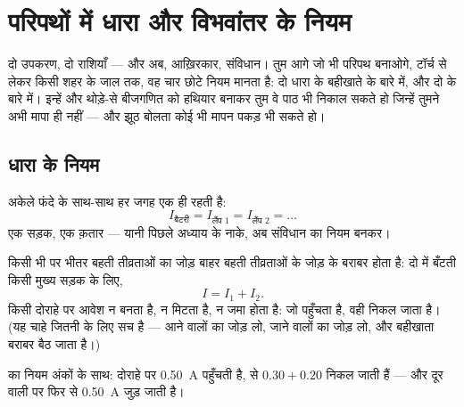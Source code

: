 \chapter{परिपथों में धारा और विभवांतर के नियम}\label{ch:g8:circuit-laws}

दो उपकरण, दो राशियाँ --- और अब, आख़िरकार, संविधान। तुम आगे जो भी परिपथ
बनाओगे, टॉर्च से लेकर किसी शहर के जाल तक, वह चार छोटे नियम मानता है:
दो धारा के बहीखाते के बारे में, और दो  के बारे में। इन्हें और
थोड़े-से बीजगणित को हथियार बनाकर तुम वे पाठ भी निकाल सकते हो जिन्हें
तुमने अभी मापा ही नहीं --- और झूठ बोलता कोई भी मापन पकड़ भी सकते हो।

\section{धारा के नियम}

\begin{proposition}[श्रेणी फंदे के लिए धारा का नियम]\label{prop:g8:circuit-laws:seriesI}
अकेले फंदे के साथ-साथ  हर जगह एक ही रहती है:
\[
I_{\text{बैटरी}} = I_{\text{लैंप 1}} = I_{\text{लैंप 2}} =
\dots
\]
एक सड़क, एक क़तार --- यानी पिछले अध्याय के नाके, अब संविधान का नियम
बनकर।
\end{proposition}

\begin{proposition}[संधि का नियम]\label{prop:g8:circuit-laws:junction}
किसी भी  पर भीतर बहती तीव्रताओं का जोड़ बाहर बहती तीव्रताओं के
जोड़ के बराबर होता है: दो  में बँटती किसी मुख्य सड़क के लिए,
\[
I = I_1 + I_2 .
\]
किसी दोराहे पर आवेश न बनता है, न मिटता है, न जमा होता है: जो पहुँचता
है, वही निकल जाता है। (यह चाहे जितनी  के लिए सच है --- आने
वालों का जोड़ लो, जाने वालों का जोड़ लो, और बहीखाता बराबर बैठ जाता
है।)
\end{proposition}

\begin{omfigure}

{\small {} का नियम अंकों के साथ: दोराहे पर \qty{0.50}{A} पहुँचती है,
 से $0.30 + 0.20$ निकल जाती हैं --- और दूर वाली  पर फिर से
\qty{0.50}{A} जुड़ जाती है।}
\end{omfigure}

